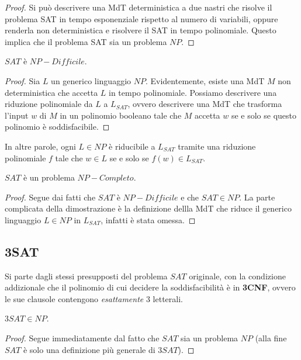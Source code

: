 \begin{proof}
	Si può descrivere una MdT deterministica a due nastri che risolve il problema SAT in tempo esponenziale rispetto al numero di variabili, oppure renderla non deterministica e risolvere il SAT in tempo polinomiale. Questo implica che il problema SAT sia un problema $NP$.
\end{proof}

\begin{lemm}
	$SAT$ è $NP-Difficile$.
\end{lemm}

\begin{proof}
	Sia $L$ un generico linguaggio $NP$. Evidentemente, esiste una MdT $M$ non deterministica che accetta $L$ in tempo polinomiale. Possiamo descrivere una riduzione polinomiale da $L$ a $L_{SAT}$, ovvero descrivere una MdT che trasforma l'input $w$ di $M$ in un polinomio booleano tale che $M$ accetta $w$ se e solo se questo polinomio è soddisfacibile.
\end{proof}

In altre parole, ogni $L \in NP$ è riducibile a $L_{SAT}$ tramite una riduzione polinomiale $f$ tale che $w \in L$ se e solo se $f(w) \in L_{SAT}$. \\

\begin{lemm}
	$SAT$ è un problema $NP-Completo$.
\end{lemm}

\begin{proof}
	Segue dai fatti che $SAT$ è $NP-Difficile$ e che $SAT \in NP$. La parte complicata della dimostrazione è la definizione dellla MdT che riduce il generico linguaggio $L \in NP$ in $L_{SAT}$, infatti è stata omessa.
\end{proof}

\subsection{3SAT}

Si parte dagli stessi presupposti del problema $SAT$ originale, con la condizione addizionale che il polinomio di cui decidere la soddisfacibilità è in \textbf{3CNF}, ovvero le sue clausole contengono \textit{esattamente} 3 letterali. \\

\begin{lemm}
  $3SAT \in NP$.
\end{lemm}

\begin{proof}
	Segue immediatamente dal fatto che $SAT$ sia un problema $NP$ (alla fine $SAT$ è solo una definizione più generale di $3SAT$).
\end{proof}

